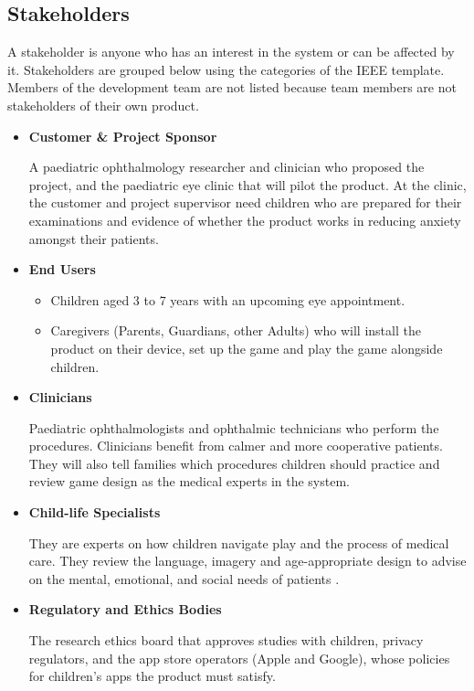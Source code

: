 \documentclass[10pt]{article}
\begin{document}
\subsection{Stakeholders}\label{sec_Stakeholders}
A stakeholder is anyone who has an interest in the system or can be affected by it. 
Stakeholders are grouped below using the categories of the IEEE template. Members of the 
development team are not listed because team members are not stakeholders of their own product.
\begin{itemize}
\item \textbf{Customer \& Project Sponsor}

A paediatric ophthalmology researcher and clinician who proposed 
the project, and the paediatric eye clinic that will pilot the product. At the clinic, the customer
and project supervisor need children who are prepared for their examinations and evidence of whether 
the product works in reducing anxiety amongst their patients.

\item \textbf{End Users}
\begin{itemize}
    \item Children aged 3 to 7 years with an upcoming eye appointment.
    \item Caregivers (Parents, Guardians, other Adults) who will install the product on their device, set 
    up the game and play the game alongside children.
\end{itemize}

\item \textbf{Clinicians}

Paediatric ophthalmologists and ophthalmic technicians who perform the procedures. Clinicians benefit from calmer and more cooperative patients. They will also tell families which procedures children should 
practice and review game design as the medical experts in the system.

\item \textbf{Child-life Specialists}

They are experts on how children navigate play and the process of medical care. 
They review the language, imagery and age-appropriate design to advise on the mental, emotional, and social 
needs of patients \cite{mayoChildLifeSpecialist}.

\item \textbf{Regulatory and Ethics Bodies}

The research ethics board that approves studies with children, privacy regulators, and the app store operators 
(Apple and Google), whose policies for children's apps the product must satisfy.


\end{itemize}
\end{document}

